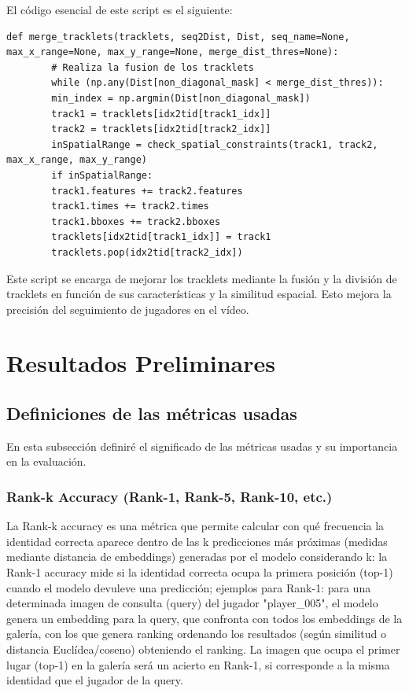 \documentclass[12pt, a4paper, twoside]{article}
\begin{document}
	El código esencial de este script es el siguiente:
	
	\begin{lstlisting}[style=pythonstyle]
		def merge_tracklets(tracklets, seq2Dist, Dist, seq_name=None, max_x_range=None, max_y_range=None, merge_dist_thres=None):
		# Realiza la fusion de los tracklets
		while (np.any(Dist[non_diagonal_mask] < merge_dist_thres)):
		min_index = np.argmin(Dist[non_diagonal_mask])
		track1 = tracklets[idx2tid[track1_idx]]
		track2 = tracklets[idx2tid[track2_idx]]
		inSpatialRange = check_spatial_constraints(track1, track2, max_x_range, max_y_range)
		if inSpatialRange:
		track1.features += track2.features
		track1.times += track2.times
		track1.bboxes += track2.bboxes
		tracklets[idx2tid[track1_idx]] = track1
		tracklets.pop(idx2tid[track2_idx])
	\end{lstlisting}
	
	Este script se encarga de mejorar los tracklets mediante la fusión y la división de tracklets en función de sus características y la similitud espacial. Esto mejora la precisión del seguimiento de jugadores en el vídeo.
	
	
	
	\section{Resultados Preliminares}
	
	\subsection{Definiciones de las métricas usadas}
	
	En esta subsección definiré el significado de las métricas usadas y su importancia en la evaluación.
	
	\subsubsection{Rank-k Accuracy (Rank-1, Rank-5, Rank-10, etc.)}
	
	La Rank-k accuracy es una métrica que permite calcular con qué frecuencia la identidad correcta aparece dentro de las k predicciones más próximas (medidas mediante distancia de embeddings) generadas por el modelo considerando k: la Rank-1 accuracy mide si la identidad correcta ocupa la primera posición (top-1) cuando el modelo devuleve una predicción; ejemplos para Rank-1: para una determinada imagen de consulta (query) del jugador "player\_005", el modelo genera un embedding para la query, que confronta con todos los embeddings de la galería, con los que genera ranking ordenando los resultados (según similitud o distancia Euclídea/coseno) obteniendo el ranking. La imagen que ocupa el primer lugar (top-1) en la galería será un acierto en Rank-1, si corresponde a la misma identidad que el jugador de la query.
	
\end{document}
